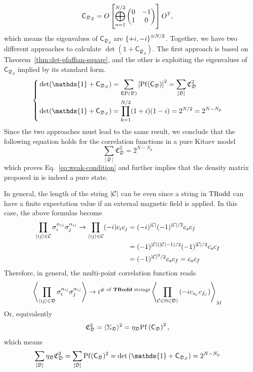 \[
\mathsf{C}_{\mathfrak{D}_Z} = O
\left[ 
\bigoplus_{n=1}^{N/2}
\begin{pmatrix}
    0 & -1 \\
    1 & 0
\end{pmatrix}
 \right]
O^T,
\]
which means the eigenvalues of $\mathsf{C}_{\mathfrak{D}_Z}$ are $\left\{ +i, -i \right\}^{\otimes N/2}$. Together, we have two different approaches to calculate $\det(\mathds{1} + \mathsf{C}_{\mathfrak{D}_Z})$. The first approach is based on Theorem~\ref{thm:det-pfaffian-square}, and the other is exploiting the eigenvalues of $\mathsf{C}_{\mathfrak{D}_Z}$ implied by its standard form. 
\[
\left\{
\begin{aligned}
    &\det(\mathds{1} + \mathsf{C}_{\mathfrak{D}_Z}) = \sum_{\mrm{EP}(\mathfrak{D})} \lrm{\mrm{Pf}(\mathsf{C}_\mathfrak{D})}^2 = \sum_{[\mathfrak{D}]} \mathfrak{C}_\mathfrak{D}^2 \\
    &\det(\mathds{1} + \mathsf{C}_{\mathfrak{D}_Z}) 
    =
    \prod_{k=1}^{N/2} (1 + i) (1 - i)
    =
    2^{N/2} = 2^{N-N_p}
\end{aligned}
\right.
\]
Since the two approaches must lead to the same result, we conclude that the following equation holds for the correlation functions in a pure Kitaev model
\begin{equation}\label{eq:weak-condition-brutal}
    \sum_{[\mathfrak{D}]}\mathfrak{C}^2_\mathfrak{D} = 2^{N-N_p}
\end{equation}
which proves Eq.~\eqref{eq:weak-condition} and further implies that the density matrix proposed in \cite{wang2026exactorganizationdensitymatrices} is indeed a pure state.

In general, the length of the string $\left| \mathcal{C} \right|$ can be even since a string in $\mathrm{TRodd}$ can have a finite expectation value if an external magnetic field is applied. In this case, the above formulas become
\begin{align*}
    \prod_{\langle ij \rangle\in\mathcal{C}}
    \sigma_{i}^{\alpha_{ij}}\sigma_{j}^{\alpha_{ij}}
    \to
    \prod_{\langle ij \rangle\in\mathcal{C}}
        (-i) c_ic_j 
    &=
    (-i)^{\left| \mathcal{C} \right|} (-1)^{\left| \mathcal{C} \right|/2} c_{s}c_{f} \\
    &= (-1)^{\left| \mathcal{C} \right|\left( \left| \mathcal{C} \right| - 1 \right)/2} (-1)^{\left| \mathcal{C} \right|/2} c_{s}c_{f} \\
    &= (-1)^{\left| \mathcal{C} \right|^2/2} c_sc_f = c_sc_f
\end{align*}
Therefore, in general, the multi-point correlation function reads
\begin{equation}\label{eq:multi-correlation-general}
    \left\langle \prod_{\langle ij \rangle\in\mathfrak{D}}
    \sigma_{i}^{\alpha_{ij}}\sigma_{j}^{\alpha_{ij}} \right\rangle
    \to
    i^{\text{\# of \textbf{TRodd} strings}}\left\langle 
    \prod_{\mathcal{C} \in \mathrm{St}(\mathfrak{D})} 
        \left( -i c_{s_\mathcal{C}}c_{f_{\mathcal{C}}}  \right)
     \right\rangle_M \nonumber 
\end{equation}
Or, equivalently
\begin{equation}
    \mathfrak{C}_\mathfrak{D}^2
    =
    \langle \Sigma_\mathfrak{D} \rangle^2
    =
    \eta_\mathfrak{D}
    \mathrm{Pf}\left( \mathsf{C}_\mathfrak{D} \right)^2,
\end{equation}
which means
\[
\sum_{[\mathfrak{D}]} \eta_\mathfrak{D} \mathfrak{C}_\mathfrak{D}^2
=
\sum_{[\mathfrak{D}]} 
\mrm{Pf}(\mathsf{C}_\mathfrak{D})^2
=
\det\lr{\mathds{1} + \mathsf{C}_{\mathfrak{D}_Z}} = 2^{N - N_p}
\]
